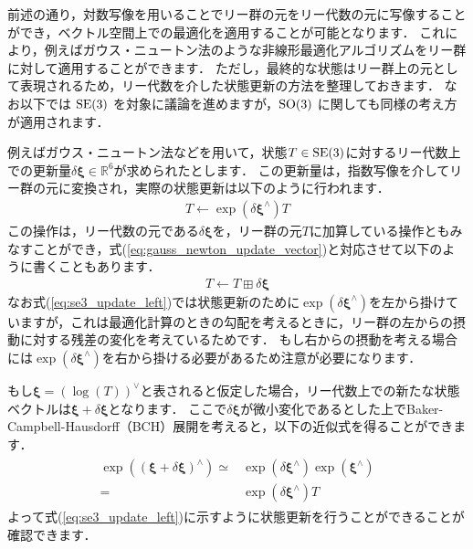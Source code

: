 前述の通り，対数写像を用いることでリー群の元をリー代数の元に写像することができ，ベクトル空間上での最適化を適用することが可能となります．
これにより，例えばガウス・ニュートン法のような非線形最適化アルゴリズムをリー群に対して適用することができます．
ただし，最終的な状態はリー群上の元として表現されるため，リー代数を介した状態更新の方法を整理しておきます．
なお以下では ${\rm SE}(3)$ を対象に議論を進めますが，${\rm SO}(3)$ に関しても同様の考え方が適用されます．

例えばガウス・ニュートン法などを用いて，状態$T \in {\rm SE}(3)$に対するリー代数上での更新量$\delta \boldsymbol \xi \in \mathbb{R}^6$が求められたとします．
この更新量は，指数写像を介してリー群の元に変換され，実際の状態更新は以下のように行われます．
%
\begin{align}
  T \leftarrow \exp \left( \delta \boldsymbol \xi^{\wedge} \right) T
  \label{eq:se3_update_left}
\end{align}
%
この操作は，リー代数の元である$\delta \boldsymbol \xi$を，リー群の元$T$に加算している操作ともみなすことができ，式(\ref{eq:gauss_newton_update_vector})と対応させて以下のように書くこともあります．
%
\begin{align}
  T \leftarrow T \boxplus \delta \boldsymbol \xi
  \label{eq:se3_update_left_boxplus}
\end{align}
%
なお式(\ref{eq:se3_update_left})では状態更新のために$\exp \left( \delta \boldsymbol \xi^{\wedge} \right)$を左から掛けていますが，これは最適化計算のときの勾配を考えるときに，リー群の左からの摂動に対する残差の変化を考えているためです．
もし右からの摂動を考える場合には$\exp \left( \delta \boldsymbol \xi^{\wedge} \right)$を右から掛ける必要があるため注意が必要になります．

もし$\boldsymbol \xi = \left( \log \left( T \right) \right)^{\vee}$と表されると仮定した場合，リー代数上での新たな状態ベクトルは$\boldsymbol \xi + \delta \boldsymbol \xi$となります．
ここで$\delta \boldsymbol \xi$が微小変化であるとした上でBaker-Campbell-Hausdorff（BCH）展開を考えると，以下の近似式を得ることができます．
%
\begin{align}
  \begin{split}
    \exp\left( (\boldsymbol \xi + \delta \boldsymbol \xi)^{\wedge} \right)
    \simeq & 
    \exp(\delta \boldsymbol \xi^{\wedge}) \exp(\boldsymbol \xi^{\wedge}) \\
    = &
    \exp(\delta \boldsymbol \xi^{\wedge}) T
  \end{split}
\end{align}
%
よって式(\ref{eq:se3_update_left})に示すように状態更新を行うことができることが確認できます．













